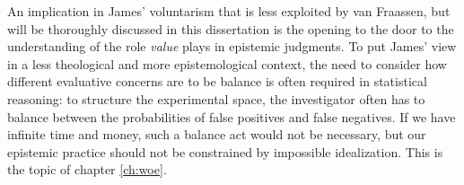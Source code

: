 An implication in  James' voluntarism that is less exploited by van Fraassen, but will be thoroughly discussed in this dissertation is the opening to the door to the understanding of the role \emph{value} plays in epistemic judgments. To put James' view in a less theological and more epistemological context, the need to consider how different evaluative concerns are to be balance is often required in statistical reasoning: to structure the experimental space, the investigator often has to balance between the probabilities of false positives and false negatives. If we have infinite time and money, such a balance act would not be necessary, but our epistemic practice should not be constrained by impossible idealization. This is the topic of chapter \ref{ch:woe}.
